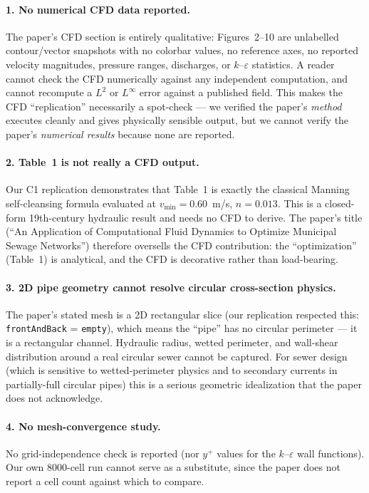 \documentclass[11pt,a4paper]{article}
\begin{document}
\paragraph{1. No numerical CFD data reported.}
The paper's CFD section is entirely qualitative: Figures~2--10 are
unlabelled contour/vector snapshots with no colorbar values, no reference
axes, no reported velocity magnitudes, pressure ranges, discharges, or
$k$--$\varepsilon$ statistics. A reader cannot check the CFD numerically
against any independent computation, and cannot recompute a $L^2$ or
$L^\infty$ error against a published field. This makes the CFD ``replication''
necessarily a spot-check --- we verified the paper's \emph{method}
executes cleanly and gives physically sensible output, but we cannot
verify the paper's \emph{numerical results} because none are reported.

\paragraph{2. Table~1 is not really a CFD output.}
Our C1 replication demonstrates that Table~1 is exactly the classical
Manning self-cleansing formula evaluated at $v_{\min}=0.60$~m/s,
$n=0.013$. This is a closed-form 19th-century hydraulic result and needs no
CFD to derive. The paper's title (``An Application of Computational Fluid
Dynamics to Optimize Municipal Sewage Networks'') therefore oversells the
CFD contribution: the ``optimization'' (Table~1) is analytical, and the CFD
is decorative rather than load-bearing.

\paragraph{3. 2D pipe geometry cannot resolve circular cross-section
physics.} The paper's stated mesh is a 2D rectangular slice (our
replication respected this: \texttt{frontAndBack} = \texttt{empty}), which
means the ``pipe'' has no circular perimeter --- it is a rectangular
channel. Hydraulic radius, wetted perimeter, and wall-shear distribution
around a real circular sewer cannot be captured. For sewer design (which is
sensitive to wetted-perimeter physics and to secondary currents in
partially-full circular pipes) this is a serious geometric idealization
that the paper does not acknowledge.

\paragraph{4. No mesh-convergence study.}
No grid-independence check is reported (nor $y^+$ values for the $k$--$\varepsilon$
wall functions). Our own 8000-cell run cannot serve as a substitute, since
the paper does not report a cell count against which to compare.
\end{document}
